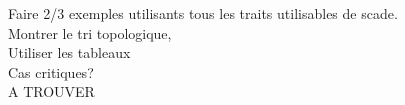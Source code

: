 


Faire 2/3 exemples utilisants tous les traits utilisables de scade.\\
Montrer le tri topologique, \\
Utiliser les tableaux\\
Cas critiques?\\
A TROUVER
